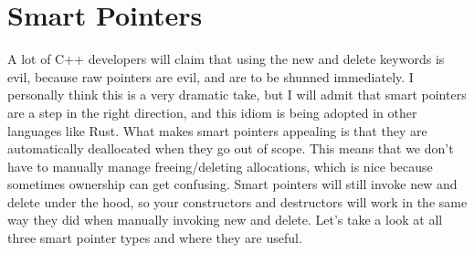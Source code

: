 \documentclass{article}
\begin{document}
\section{Smart Pointers}

A lot of C++ developers will claim that using the new and delete keywords is evil, because raw pointers are
evil, and are to be shunned immediately. I personally think this is a very dramatic take, but I will admit
that smart pointers are a step in the right direction, and this idiom is being adopted in other languages like
Rust. What makes smart pointers appealing is that they are automatically deallocated when they go out of
scope. This means that we don't have to manually manage freeing/deleting allocations, which is nice because
sometimes ownership can get confusing. Smart pointers will still invoke new and delete under the hood, so
your constructors and destructors will work in the same way they did when manually invoking new and delete.
Let's take a look at all three smart pointer types and where they are useful.
\end{document}
